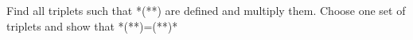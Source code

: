 \documentclass[11pt,answers]{exam} %
\begin{document}



Find all triplets such that *(**) are defined and multiply them. Choose one set of triplets and show that *(**)=(**)*
\end{document}
